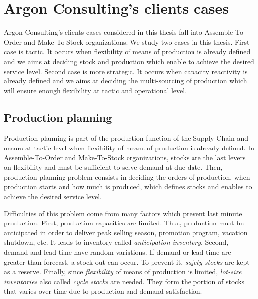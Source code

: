 \section{Argon Consulting's clients cases}


Argon Consulting's clients cases considered in this thesis fall into Assemble-To-Order and Make-To-Stock organizations.
We study two cases in this thesis.
First case is tactic.
It occurs when flexibility of means of production is already defined and we aims at deciding stock and production  which enable to achieve the desired service level.
Second case is more strategic.
It occurs when capacity reactivity is already defined and we aims at deciding the multi-sourcing of production which will ensure enough flexibility at tactic and operational level.


\subsection{Production planning}
\label{sec:business-context:argon:pdp}


Production planning is part of the production function of the Supply Chain and occurs at tactic level when flexibility of means of production is already defined.
In Assemble-To-Order and Make-To-Stock organizations, stocks are the last levers on flexibility and must be sufficient to serve demand at due date.
Then, production planning problem consists in deciding the orders of production, \ie when production starts and how much is produced, which defines stocks and enables to achieve the desired service level.


Difficulties of this problem come from many factors which prevent last minute production.
First, production capacities are limited.
Thus, production must be anticipated in order to deliver peak selling season, promotion program, vacation shutdown, etc.
It leads to inventory called \emph{anticipation inventory}.
Second, demand and lead time have random variations.
If demand or lead time are greater than forecast, a stock-out can occur.
To prevent it, \emph{safety stocks} are kept as a reserve.
Finally, since \emph{flexibility} of means of production is limited, \emph{lot-size inventories} also called \emph{cycle stocks} are needed.
They form the portion of stocks that varies over time due to production and demand satisfaction.


